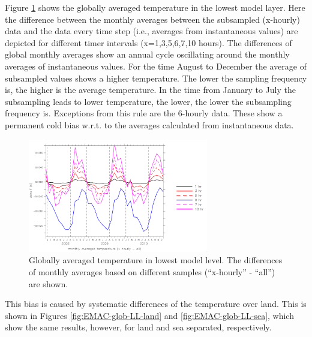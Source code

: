 \documentclass[twoside]{article}
\begin{document}
Figure \ref{fig:EMAC-glob-LL-temp} shows the globally averaged temperature in
the lowest model layer. Here the difference between the monthly averages
between the subsampled (x-hourly) data and the data every time step (i.e.,
averages from instantaneous values) are depicted for different timer intervals
(x=1,3,5,6,7,10 hours).  The differences of global monthly averages show an
annual cycle oscillating around the monthly averages of instantaneous
values. For the time August to December the average of subsampled values
shows a higher temperature. The lower the sampling frequency is, the higher is
the average temperature. In the time from January to July the subsampling
leads to lower temperature, the lower, the lower the subsampling frequency
is. Exceptions from this rule are the 6-hourly data. These show a
permanent cold bias w.r.t. to the averages calculated from instantaneous data.

\begin{figure}
  \begin{center}
  \includegraphics[width=0.7\textwidth]{EMAC_global_ll_temp}
  \caption{\label{fig:EMAC-glob-LL-temp} Globally averaged temperature in lowest
    model level. The differences of monthly averages based on different
    samples (``x-hourly'' - ``all'') are shown.}
  \end{center}
\end{figure}

This bias is caused by systematic differences of the temperature over land.
This is shown in Figures \ref{fig:EMAC-glob-LL-land} and
\ref{fig:EMAC-glob-LL-sea}, which show the same results, however, for land and
sea separated, respectively.
\end{document}
